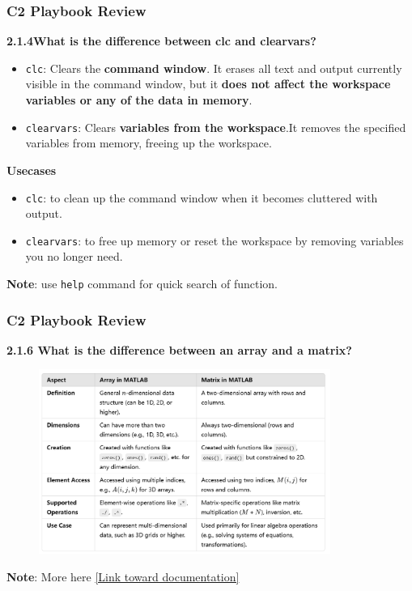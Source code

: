 \documentclass[
	11pt, %
]{beamer}
\begin{document}
\begin{frame}
	\frametitle{C2 Playbook Review}
	\textbf{2.1.4What is the difference between clc and clearvars?}
	\begin{itemize}
        \item \texttt{clc}: Clears the \textbf{command window}.
        It erases all text and output currently visible in the command window, but it \textbf{does not affect the workspace variables or any of the data in memory}.
        \item \texttt{clearvars}: Clears \textbf{variables from the workspace}.It removes the specified variables from memory, freeing up the workspace.
    \end{itemize}
	\smallskip
    \textbf{Usecases}
	\begin{itemize}
        \item \texttt{clc}: to clean up the command window when it becomes cluttered with output.
        \item \texttt{clearvars}: to free up memory or reset the workspace by removing variables you no longer need.
    \end{itemize}

    \smallskip

    \textbf{Note}: use \texttt{help} command for quick search of function.
\end{frame}


\begin{frame}
	\frametitle{C2 Playbook Review}
	\textbf{2.1.6 What is the difference between an array and a matrix? }
    \begin{figure}
        \centering
        \includegraphics[width=0.85\textwidth]{array_matrix.png}
    \end{figure}

    \textbf{Note}: More here \href{https://www.mathworks.com/help/matlab/matlab_prog/array-vs-matrix-operations.html}{[Link toward documentation]}
\end{frame}
\end{document}
